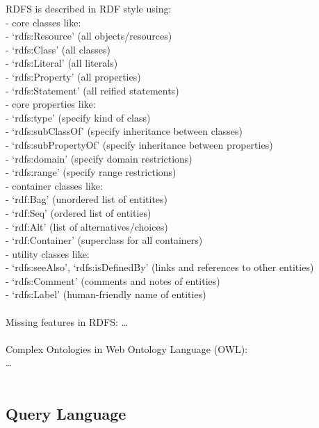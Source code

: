 RDFS is described in RDF style using: \\
- core classes like: \\
  - `rdfs:Resource' (all objects/resources) \\
  - `rdfs:Class' (all classes) \\
  - `rdfs:Literal' (all literals) \\
  - `rdfs:Property' (all properties) \\
  - `rdfs:Statement' (all reified statements) \\
- core properties like: \\
  - `rdfs:type' (specify kind of class) \\
  - `rdfs:subClassOf' (specify inheritance between classes) \\
  - `rdfs:subPropertyOf' (specify inheritance between properties) \\
  - `rdfs:domain' (specify domain restrictions) \\
  - `rdfs:range' (specify range restrictions) \\
- container classes like: \\
  - `rdf:Bag'  (unordered list of entitites) \\
  - `rdf:Seq'  (ordered list of entities) \\
  - `rdf:Alt'  (list of alternatives/choices) \\
  - `rdf:Container' (superclass for all containers) \\
- utility classes like: \\
  - `rdfs:seeAlso', `rdfs:isDefinedBy' (links and references to other entities) \\
  - `rdfs:Comment' (comments and notes of entities) \\
  - `rdfs:Label' (human-friendly name of entities) \\
\\

Missing features in RDFS: \ldots  \\
\\
Complex Ontologies in Web Ontology Language (OWL): \\
\ldots \\
\\


\subsection{Query Language}
\label{sec:semantic_querylang}

